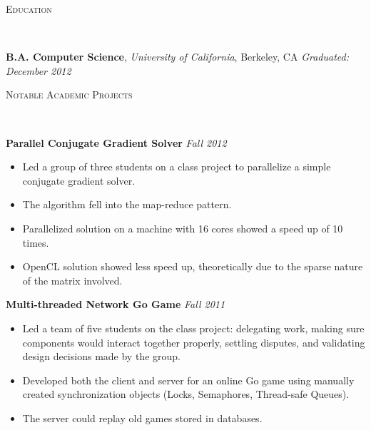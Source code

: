 \documentclass{article}
\newenvironment{changemargin}[2]{%
  \begin{list}{}{%
    \setlength{\topsep}{0pt}%
    \setlength{\leftmargin}{#1}%
    \setlength{\rightmargin}{#2}%
    \setlength{\listparindent}{\parindent}%
    \setlength{\itemindent}{\parindent}%
    \setlength{\parsep}{\parskip}%
  }%
  \item[]}{\end{list}
}
\newcommand{\lineover}{
  \begin{changemargin}{-0.05in}{-0.05in}
    \vspace*{-8pt}
    \hrulefill \\
    \vspace*{-2pt}
  \end{changemargin}
}
\newcommand{\header}[1]{
  \begin{changemargin}{-0.5in}{-0.5in}
    \scshape{#1}\\
  \lineover
  \end{changemargin}
}
\newenvironment{body} {
  \vspace*{-16pt}
  \begin{changemargin}{-0.25in}{-0.5in}
  }
  {\end{changemargin}
}
\begin{document}
\smallskip


\header{Education}

\begin{body}
  \vspace{14pt}
  \textbf{B.A. Computer Science}, \emph{University of California}, Berkeley, CA \hfill \emph{Graduated: December 2012} \\
\end{body}

\smallskip


\header{Notable Academic Projects}

\begin{body}
  \vspace{14pt}
  \textbf{Parallel Conjugate Gradient Solver} \hfill {} \emph{Fall 2012}\\
  \vspace*{-4pt}
  \begin{itemize} \itemsep -0pt
    \item Led a group of three students on a class project to parallelize a simple conjugate gradient solver.
    \item The algorithm fell into the map-reduce pattern.
    \item Parallelized solution on a machine with 16 cores showed a speed up of 10 times.
    \item OpenCL solution showed less speed up, theoretically due to the sparse nature of the matrix involved.
  \end{itemize}

  \textbf{Multi-threaded Network Go Game} \hfill {} \emph{Fall 2011}\\
  \vspace*{-4pt}
  \begin{itemize} \itemsep -0pt
    \item Led a team of five students on the class project: delegating work, making sure components would interact together properly, settling disputes, and validating design decisions made by the group.
    \item Developed both the client and server for an online Go game using manually created synchronization objects (Locks, Semaphores, Thread-safe Queues).
    \item The server could replay old games stored in databases.
  \end{itemize}
\end{body}

\smallskip
\end{document}
